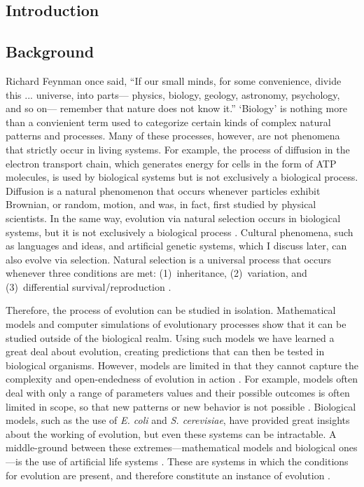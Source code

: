 \begin{doublespace}

\chapter*{Introduction}

\section*{Background}

Richard Feynman once said, ``If our small minds, for some convenience,
divide this ... universe, into parts---%
physics, biology, geology, astronomy, psychology, and so on---%
remember that nature does not know it.''
%
`Biology' is nothing more than a convienient term used to categorize
certain kinds of complex natural patterns and processes.
%
Many of these processes, however, are not phenomena
that strictly occur in living systems.
%
For example, the process of diffusion in the electron transport chain,
which generates energy for cells in the form of ATP molecules,
is used by biological systems but is not exclusively a biological process.
%
Diffusion is a natural phenomenon that occurs whenever
particles exhibit Brownian, or random, motion,
and was, in fact, first studied by physical scientists.
%
In the same way, evolution via natural selection occurs in biological systems,
but it is not exclusively a biological process \citep{pen07}.
%
Cultural phenomena, such as languages and ideas,
and artificial genetic systems, which I discuss later,
can also evolve via selection.
%
Natural selection is a universal process that occurs whenever
three conditions are met: (1)~inheritance, (2)~variation,
and (3)~differential survival/reproduction \citep{ada06}.



Therefore, the process of evolution can be studied in isolation.
%
Mathematical models and computer simulations of evolutionary processes
show that it can be studied outside of the biological realm.
%
Using such models we have learned a great deal about evolution,
creating predictions that can then be tested in biological organisms.
%
However, models are limited in that they cannot capture
the complexity and open-endedness of evolution in action \citep{yed01}.
%
For example, models often deal with only a range of parameters values
and their possible outcomes is often limited in scope,
so that new patterns or new behavior is not possible \citep{yed01}.
%
Biological models, such as the use of \emph{E. coli} and \emph{S. cerevisiae},
have provided great insights about the working of evolution,
but even these systems can be intractable.
%
A middle-ground between these extremes---mathematical models
and biological ones---is the use of artificial life systems \citep{yed01}.
%
These are systems in which the conditions for evolution are present,
and therefore constitute an instance of evolution \citep{pen07}.




\end{doublespace}
